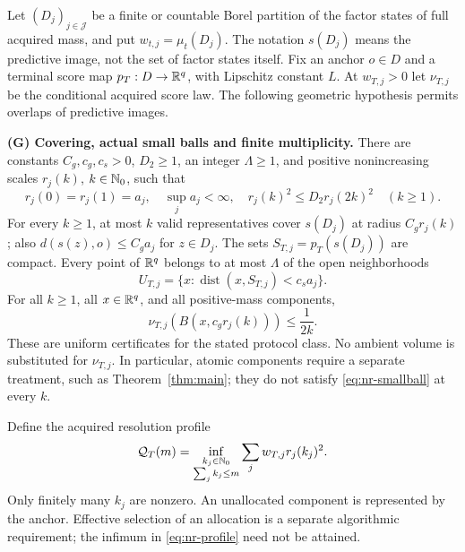 Let $(D_j)_{j\in\mathcal J}$ be a finite or countable Borel partition of the factor states of full acquired mass, and put $w_{t,j}=\mu_t(D_j)$. The notation $s(D_j)$ means the predictive image, not the set of factor states itself. Fix an anchor $o\in D$ and a terminal score map $p_T:D\to\mathbb R^q$, with Lipschitz constant $L$. At $w_{T,j}>0$ let $\nu_{T,j}$ be the conditional acquired score law. The following geometric hypothesis permits overlaps of predictive images.

\smallskip\noindent\textbf{(G) Covering, actual small balls and finite multiplicity.}
There are constants $C_g,c_g,c_s>0$, $D_2\ge1$, an integer $\Lambda\ge1$, and positive nonincreasing scales $r_j(k)$, $k\in\mathbb N_0$, such that
\begin{equation}\label{eq:nr-regular}
 r_j(0)=r_j(1)=a_j,\quad \sup_j a_j<\infty,\quad
 r_j(k)^2\le D_2r_j(2k)^2\quad(k\ge1).
\end{equation}
For every $k\ge1$, at most $k$ valid representatives cover $s(D_j)$ at radius $C_g r_j(k)$; also $d(s(z),o)\le C_g a_j$ for $z\in D_j$. The sets $S_{T,j}=p_T(s(D_j))$ are compact. Every point of $\mathbb R^q$ belongs to at most $\Lambda$ of the open neighborhoods
\[
 U_{T,j}=\{x:\operatorname{dist}(x,S_{T,j})<c_sa_j\}.
\]
For all $k\ge1$, all $x\in\mathbb R^q$, and all positive-mass components,
\begin{equation}\label{eq:nr-smallball}
 \nu_{T,j}(B(x,c_g r_j(k)))\le\frac1{2k}.
\end{equation}
These are uniform certificates for the stated protocol class. No ambient volume is substituted for $\nu_{T,j}$. In particular, atomic components require a separate treatment, such as Theorem~\ref{thm:main}; they do not satisfy \eqref{eq:nr-smallball} at every $k$.

Define the acquired resolution profile
\begin{equation}\label{eq:nr-profile}
 \mathcal Q_T(m)=\inf_{\substack{k_j\in\mathbb N_0\\\sum_jk_j\le m}}
                       \sum_jw_{T,j}r_j(k_j)^2.
\end{equation}
Only finitely many $k_j$ are nonzero. An unallocated component is represented by the anchor. Effective selection of an allocation is a separate algorithmic requirement; the infimum in \eqref{eq:nr-profile} need not be attained.

